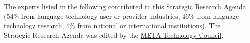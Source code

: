 \documentclass[10pt, plain]{../../metanetpaper}
\begin{document}
\clearpage


\appendix
{}



\begin{footnotesize}


\end{footnotesize}

\clearpage


\label{sec:list-of-contributors}

\begin{small}
The experts listed in the following contributed to this Strategic Research Agenda (54\% from language technology user or provider industries, 46\% from language technology research, 4\% from national or international institutions). The Strategic Research Agenda was edited by the \href{http://www.meta-net.eu/vision/technology-council-members/all}{META Technology Council}.
\end{small}

%
\end{document}
